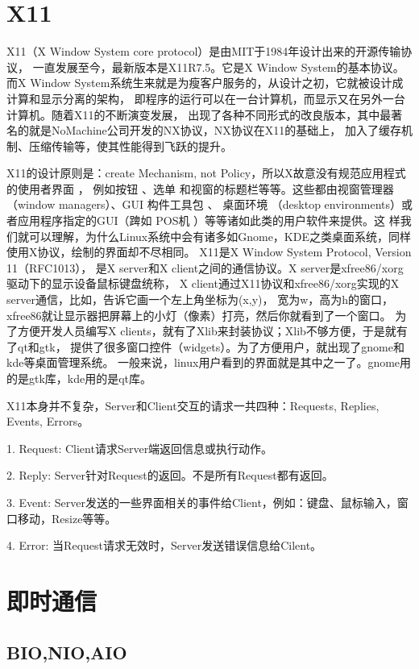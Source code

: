 \documentclass{book}
\begin{document}
\section{X11}

X11（X Window System core protocol）是由MIT于1984年设计出来的开源传输协议，
一直发展至今，最新版本是X11R7.5。它是X Window System的基本协议。
而X Window System系统生来就是为瘦客户服务的，从设计之初，它就被设计成计算和显示分离的架构，
即程序的运行可以在一台计算机，而显示又在另外一台计算机。随着X11的不断演变发展，
出现了各种不同形式的改良版本，其中最著名的就是NoMachine公司开发的NX协议，NX协议在X11的基础上，
加入了缓存机制、压缩传输等，使其性能得到飞跃的提升。

X11的设计原则是：create Mechanism, not Policy，所以X故意没有规范应用程式的使用者界面 ，
例如按钮 、选单 和视窗的标题栏等等。这些都由视窗管理器 （window managers）、GUI 构件工具包 、
桌面环境 （desktop environments）或者应用程序指定的GUI（䠋如 POS机 ）等等诸如此类的用户软件来提供。这
样我们就可以理解，为什么Linux系统中会有诸多如Gnome，KDE之类桌面系统，同样使用X协议，绘制的界面却不尽相同。
X11是X Window System Protocol, Version 11（RFC1013），
是X server和X client之间的通信协议。X server是xfree86/xorg驱动下的显示设备鼠标键盘统称，
X client通过X11协议和xfree86/xorg实现的X server通信，比如，告诉它画一个左上角坐标为(x,y)，
宽为w，高为h的窗口，xfree86就让显示器把屏幕上的小灯（像素）打亮，然后你就看到了一个窗口。
为了方便开发人员编写X clients，就有了Xlib来封装协议；Xlib不够方便，于是就有了qt和gtk，
提供了很多窗口控件（widgets）。为了方便用户，就出现了gnome和kde等桌面管理系统。
一般来说，linux用户看到的界面就是其中之一了。gnome用的是gtk库，kde用的是qt库。

X11本身并不复杂，Server和Client交互的请求一共四种：Requests, Replies, Events, Errors。

1. Request: Client请求Server端返回信息或执行动作。

2. Reply: Server针对Request的返回。不是所有Request都有返回。

3. Event: Server发送的一些界面相关的事件给Client，例如：键盘、鼠标输入，窗口移动，Resize等等。

4. Error: 当Request请求无效时，Server发送错误信息给Cilent。

\section{即时通信}

\subsection{BIO,NIO,AIO}
\end{document}
